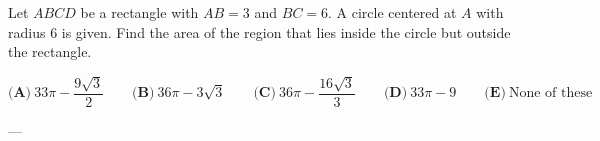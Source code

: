 Let \(ABCD\) be a rectangle with \(AB=3\) and \(BC=6\). A circle centered at \(A\) with radius \(6\) is given. Find the area of the region that lies inside the circle but outside the rectangle.



\[
\textbf{(A)}\ 33\pi-\dfrac{9\sqrt3}{2}
\qquad
\textbf{(B)}\ 36\pi-3\sqrt3
\qquad
\textbf{(C)}\ 36\pi-\dfrac{16\sqrt3}{3}
\qquad
\textbf{(D)}\ 33\pi-9
\qquad
\textbf{(E)}\ \text{None of these}
\]

---
